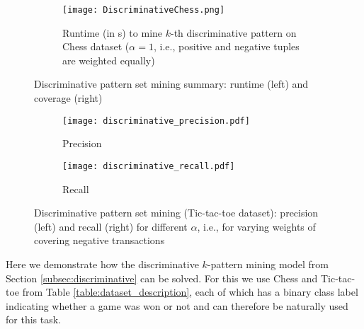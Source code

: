 \begin{figure}[thb]
\begin{subfigure}{.48\textwidth}
  \captionsetup{skip = 0pt}
\begin{center}
  \texttt{[image: DiscriminativeChess.png]}
  \caption{Runtime (in s) to mine $k$-th discriminative pattern on Chess dataset ($\alpha = 1$, i.e., positive and negative tuples are weighted equally)}
  \label{figure:discriminative_chess}
 \end{center}
\end{subfigure}
\begin{subfigure}{.49\textwidth}
\begin{center}
\captionsetup{skip = 0pt, font=small}
\label{table:discriminative_results}
\end{center}
\end{subfigure}
\caption{Discriminative pattern set mining summary: runtime (left) and coverage (right)}
\end{figure}

\begin{figure}[thb]
\begin{center}
\begin{subfigure}{.49\textwidth}
  \captionsetup{skip = -3pt}
  \texttt{[image: discriminative\_precision.pdf]}
  \caption{Precision}
\end{subfigure}
   \hfill 
\begin{subfigure}{.49\textwidth}
  \captionsetup{skip = -3pt}
  \texttt{[image: discriminative\_recall.pdf]}
  \caption{Recall}
 \end{subfigure}
 \end{center}
  \captionsetup{skip = -4pt}
  \caption{Discriminative pattern set mining (Tic-tac-toe dataset): precision (left) and recall (right) for different $\alpha$, i.e., for varying weights of covering  negative transactions}
  \label{fig:discriminative_precision_recall}
\end{figure}
 Here we demonstrate how the discriminative $k$-pattern mining model from Section \ref{subsec:discriminative} can be solved. For this we use Chess and Tic-tac-toe from Table \ref{table:dataset_description}, each of which has a binary class label indicating whether a game was won or not and can therefore be naturally used for this task. 

